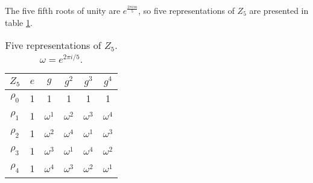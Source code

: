 \begin{example}[$Z_5$]
	The five fifth roots of unity are $e^{\frac{2\pi im}{5}}$, so five representations of $Z_5$ are presented in table \ref{table:Z5}.
	
	\begin{table}[hbt!]
		\centering
		\caption{Five representations of $Z_5$. $\omega = e^{2 \pi i/5}$.}
		\begin{tabular}{c | c c c c c}
			\label{table:Z5}
			$Z_5$ & $e$ & $g$        & $g^2$      & $g^3$      & $g^4$      \\ \hline
			$\rho_0$            & 1   & 1          & 1          & 1          & 1          \\
			$\rho_1$            & 1   & $\omega^1$ & $\omega^2$ & $\omega^3$ & $\omega^4$ \\
			$\rho_2$            & 1   & $\omega^2$ & $\omega^4$ & $\omega^1$ & $\omega^3$ \\
			$\rho_3$            & 1   & $\omega^3$ & $\omega^1$ & $\omega^4$ & $\omega^2$ \\
			$\rho_4$            & 1   & $\omega^4$ & $\omega^3$ & $\omega^2$ & $\omega^1$
		\end{tabular}
	\end{table}
\end{example}
